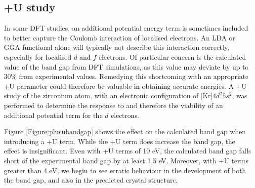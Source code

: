 \subsection{+U study}

In some DFT studies, an additional potential energy term is sometimes included to better capture the Coulomb interaction of localised electrons. An LDA or GGA functional alone will typically not describe this interaction correctly, especially for localised $d$ and $f$ electrons. Of particular concern is the calculated value of the band gap from DFT simulations, as this value may deviate by up to 30\% from experimental values. Remedying this shortcoming with an appropriate +U parameter could therefore be valuable in obtaining accurate energies. A +U study of the zirconium atom, with an electronic configuration of [Kr]$4d^{2}5s^{2}$, was performed to determine the response to and therefore the viability of an additional potential term for the $d$ electrons.

Figure \ref{Figure:plusubandgap} shows the effect on the calculated band gap when introducing a +U term. While the +U term does increase the band gap, the effect is insignificant. Even with +U terms of 10 eV, the calculated band gap falls short of the experimental band gap by at least 1.5 eV. Moreover, with +U terms greater than 4 eV, we begin to see erratic behaviour in the development of both the band gap, and also in the predicted crystal structure.






